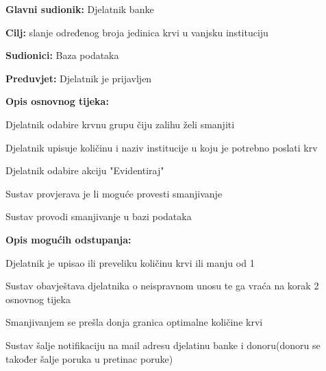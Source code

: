 \noindent {}
					\begin{packed_item}
	
						\item \textbf{Glavni sudionik: }Djelatnik banke
						\item \textbf{Cilj:} slanje određenog broja jedinica krvi u vanjsku instituciju
						\item \textbf{Sudionici:} Baza podataka
						\item \textbf{Preduvjet:} Djelatnik je prijavljen
						\item \textbf{Opis osnovnog tijeka:}
						
						\item[] \begin{packed_enum}
	
							\item Djelatnik odabire krvnu grupu čiju zalihu želi smanjiti
							\item Djelatnik upisuje količinu i naziv institucije u koju je potrebno poslati krv
							\item Djelatnik odabire akciju "Evidentiraj"
							\item Sustav provjerava je li moguće provesti smanjivanje
							\item Sustav provodi smanjivanje u bazi podataka
						\end{packed_enum}
						\item  \textbf{Opis mogućih odstupanja:}
						
						\item[] \begin{packed_item}
							\item[4.a] Djelatnik je upisao ili preveliku količinu krvi ili manju od 1				
							\item[] \begin{packed_enum}
								
								\item  Sustav obavještava djelatnika o neispravnom unosu te ga vraća na korak 2 osnovnog tijeka
									\end{packed_enum}
							\item[5.a] Smanjivanjem se prešla donja granica optimalne količine krvi
							\item[] \begin{packed_enum}
								
								\item  Sustav šalje notifikaciju na mail adresu djelatinu banke i donoru(donoru se također šalje poruka u pretinac poruke)
							 

								
									\end{packed_enum}
								\end{packed_item}			
									
									
									
					\end{packed_item}
				


